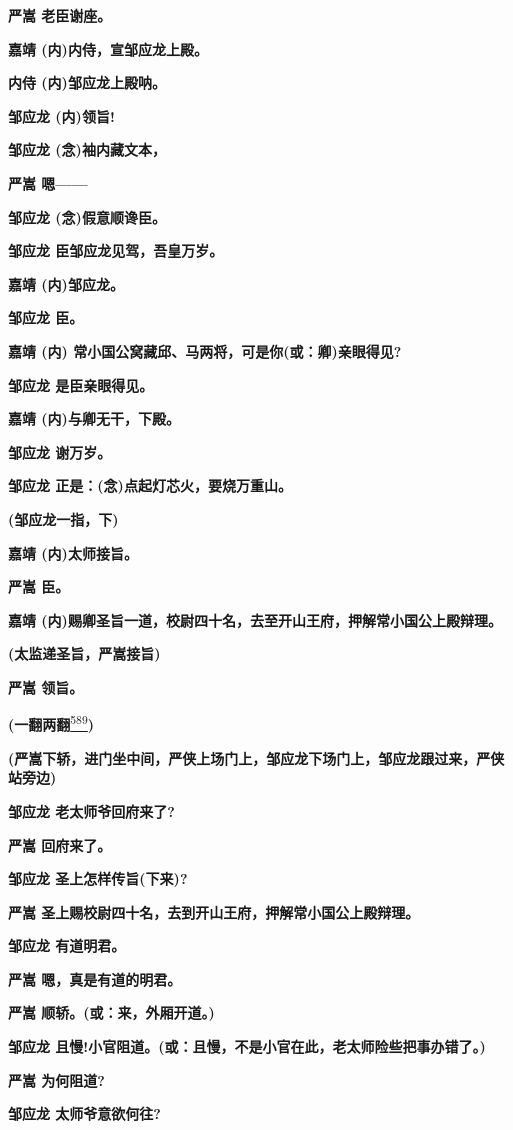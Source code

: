 \textbf{严嵩 老臣谢座。}

\textbf{嘉靖 (内)内侍，宣邹应龙上殿。}

\textbf{内侍 (内)邹应龙上殿呐。}

\textbf{邹应龙 (内)领旨!}

\textbf{邹应龙 (念)袖内藏文本，}

\textbf{严嵩 嗯------}

\textbf{邹应龙 (念)假意顺谗臣。}

\textbf{邹应龙 臣邹应龙见驾，吾皇万岁。}

\textbf{嘉靖 (内)邹应龙。}

\textbf{邹应龙 臣。}

\textbf{嘉靖 (内) 常小国公窝藏邱、马两将，可是你(或：卿)亲眼得见?}

\textbf{邹应龙 是臣亲眼得见。}

\textbf{嘉靖 (内)与卿无干，下殿。}

\textbf{邹应龙 谢万岁。}

\textbf{邹应龙 正是：(念)点起灯芯火，要烧万重山。}

\textbf{(邹应龙一指，下)}

\textbf{嘉靖 (内)太师接旨。}

\textbf{严嵩 臣。}

\textbf{嘉靖
(内)赐卿圣旨一道，校尉四十名，去至开山王府，押解常小国公上殿辩理。}

\textbf{(太监递圣旨，严嵩接旨)}

\textbf{严嵩 领旨。}

\textbf{(一翻两翻}\protect\hyperlink{fn589}{\textsuperscript{589}}\textbf{)}

\textbf{(严嵩下轿，进门坐中间，严侠上场门上，邹应龙下场门上，邹应龙跟过来，严侠站旁边)}

\textbf{邹应龙 老太师爷回府来了?}

\textbf{严嵩 回府来了。}

\textbf{邹应龙 圣上怎样传旨(下来)?}

\textbf{严嵩 圣上赐校尉四十名，去到开山王府，押解常小国公上殿辩理。}

\textbf{邹应龙 有道明君。}

\textbf{严嵩 嗯，真是有道的明君。}

\textbf{严嵩 顺轿。(或：来，外厢开道。)}

\textbf{邹应龙
且慢!小官阻道。(或：且慢，不是小官在此，老太师险些把事办错了。)}

\textbf{严嵩 为何阻道?}

\textbf{邹应龙 太师爷意欲何往?}

